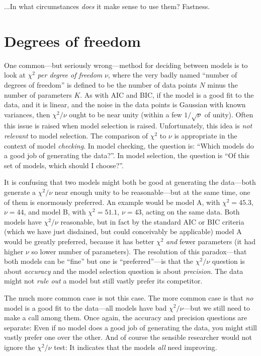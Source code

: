 \documentclass[12pt,twoside]{article}
\begin{document}
...In what circumstances \emph{does} it make sense to use them?  Fastness.

\section{Degrees of freedom}

One common---but seriously wrong---method for deciding between models
is to look at $\chi^2$ \emph{per degree of freedom} $\nu$, where the
very badly named ``number of degrees of freedom'' is defined to be the number
of data points $N$ minus the number of parameters $K$.  As with AIC
and BIC, if the model is a good fit to the data, and it is linear, and
the noise in the data points is Gaussian with known variances, then
$\chi^2/\nu$ ought to be near unity (within a few $1/\sqrt{\nu}$ of
unity).  Often this issue is raised when model selection is raised.
Unfortunately, this idea is \emph{not relevant} to model selection.
The comparison of $\chi^2$ to $\nu$ is appropriate in the context of
model \emph{checking}.  In model checking, the question is: ``Which
models do a good job of generating the data?''.  In model selection,
the question is ``Of this set of models, which should I choose?''.

It is confusing that two models might both be good at generating the
data---both generate a $\chi^2/\nu$ near enough unity to be
reasonable---but at the same time, one of them is enormously
preferred.  An example would be model A, with $\chi^2=45.3$, $\nu=44$,
and model B, with $\chi^2=51.1$, $\nu=43$, acting on the same data.
Both models have $\chi^2/\nu$ reasonable, but in fact by the standard
AIC or BIC criteria (which we have just disdained, but could
conceivably be applicable) model A would be greatly preferred, because
it has better $\chi^2$ \emph{and} fewer parameters (it had higher
$\nu$ so lower number of parameters).  The resolution of this
paradox---that both models can be ``fine'' but one is
``preferred''---is that the $\chi^2/\nu$ question is about
\emph{accuracy} and the model selection question is about
\emph{precision}.  The data might not \emph{rule out} a model but
still vastly prefer its competitor.

The much more common case is not this case.  The more common case is
that \emph{no} model is a good fit to the data---all models have bad
$\chi^2/\nu$---but we still need to make a call among them.  Once
again, the accuracy and precision questions are separate: Even if no
model does a good job of generating the data, you might still vastly
prefer one over the other.  And of course the sensible researcher
would not ignore the $\chi^2/\nu$ test: It indicates that the models
\emph{all} need improving.
\end{document}
